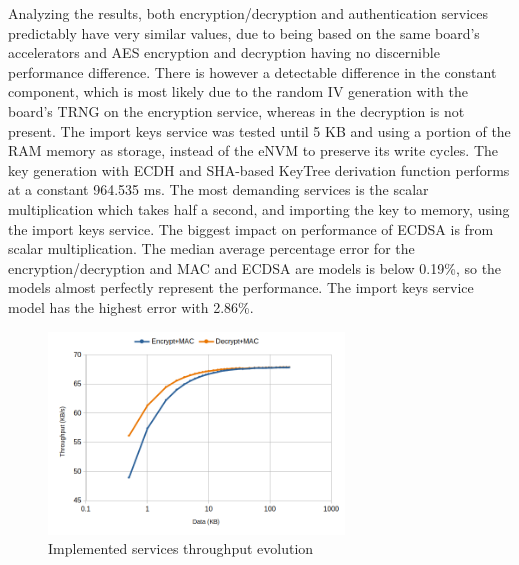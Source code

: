 Analyzing the results, both encryption/decryption and authentication services predictably have very similar values, due to being based on the same board's accelerators and \ac{AES} encryption and decryption having no discernible performance difference.
There is however a detectable difference in the constant component, which is most likely due to the random \ac{IV} generation with the board's \ac{TRNG} on the encryption service, whereas in the decryption is not present.
The import keys service was tested until 5 KB and using a portion of the RAM memory as storage, instead of the eNVM to preserve its write cycles.
The key generation with \ac{ECDH} and \ac{SHA}-based KeyTree derivation function performs at a constant 964.535 ms. The most demanding services is the scalar multiplication which takes half a second, and importing the key to memory, using the import keys service.
The biggest impact on performance of \ac{ECDSA} is from scalar multiplication.
The median average percentage error for the encryption/decryption and MAC and \ac{ECDSA} are models is below 0.19\%, so the models almost perfectly represent the performance. The import keys service model has the highest error with 2.86\%.

\begin{figure}[h!]
	\centering
	\includegraphics[width=0.7\textwidth]{./Images/services-tput.png}
	\caption{Implemented services throughput evolution}
	\label{fig:performance:services-tput}
\end{figure}

